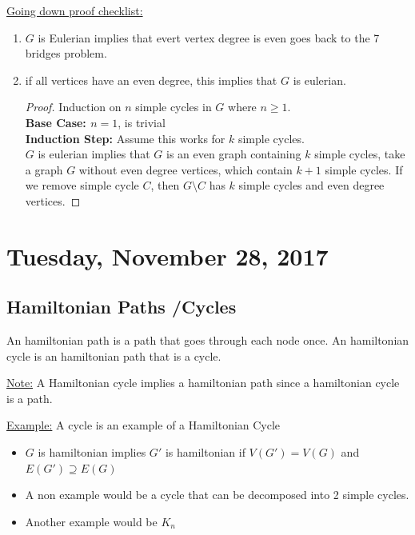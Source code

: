 \documentclass[12pt]{article}
\begin{document}
\underline{Going down proof checklist:}
\begin{enumerate}
	\item{$G$ is Eulerian implies that evert vertex degree is even goes back to the 7 bridges problem.}
	\item{
	if all vertices have an even degree, this implies that $G$ is eulerian.
	\begin{proof}
		Induction on $n$ simple cycles in $G$ where $n\geq 1$.\\
		\textbf{Base Case: $n=1$}, is trivial\\
		\textbf{Induction Step:} Assume this works for $k$ simple cycles.\\
		$G$ is eulerian implies that $G$ is an even graph containing $k$ simple cycles, take a graph $G$ without even degree vertices, which contain $k+1$ simple cycles. If we remove simple cycle $C$, then $G \setminus C$ has $k$ simple cycles and even degree vertices.
	\end{proof}
	}
\end{enumerate}

\newpage

\section{Tuesday, November 28, 2017}

\subsection{Hamiltonian Paths \slash  Cycles}

\begin{tcolorbox}[title=Definition: Hamiltonian Path \slash  Cycle]
	An hamiltonian path is a path that goes through each node once. An hamiltonian cycle is an hamiltonian path that is a cycle.
\end{tcolorbox}

\begin{tcolorbox}
	\underline{Note:} A Hamiltonian cycle implies a hamiltonian path since a hamiltonian cycle is a path.
\end{tcolorbox}

\underline{Example:} A cycle is an example of a Hamiltonian Cycle
\begin{itemize}
	\item{$G$ is hamiltonian implies $G'$ is hamiltonian if $V(G') = V(G)$ and $E(G') \supseteq E(G)$}
	\item{A non example would be a cycle that can be decomposed into 2 simple cycles.}
	\item{Another example would be $K_n$}
\end{itemize}
\end{document}

